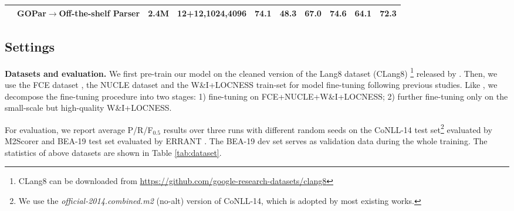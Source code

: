 \documentclass[11pt]{article}
\begin{document}
\begin{table*}[tp!]
{\begin{tabular}{clcccccccc}
                                   & \hspace{0.3cm}\textbf{GOPar$\rightarrow$Off-the-shelf Parser}&   2.4M &   12+12,1024,4096 & 74.1          & 48.3       & 67.0          & 74.6       & 64.1       & 72.3          \\
\bottomrule
\end{tabular}
}
\caption{\textbf{Single-model} results on English GEC test-sets. Our results are averaged over three runs with different random seeds. \textbf{Layer}, \textbf{Hidden} and \textbf{FFN} denote the depth, hidden size and feed-forward network size of Transformer. ``\textbf{w/ PLM}'' means using pre-trained language models. ``\textbf{w/ syntax}'' means using syntactic knowledge. Besides the public human-annotated training data, current GEC systems variously use private and/or artificial data, including: $^{\circ}$artificial Gigaword (70M sentences), $^{\vartriangle}$Wikipedia revision histories (170M), $^{\blacktriangle}$artificial Wikipedia (170M), $^{\square}$artificial Colossal Clean Crawled Corpus (200M), $^{\lozenge}$artificial one-billion-word (9M), $^{\blacklozenge}$artificial one-billion-word (10M), $^{\spadesuit}$artificial one-billion-word (30M) , $^{\heartsuit}$cleaned version of Lang8 (2.4M).}

\label{tab:main:results}
\end{table*} \subsection{Settings}
\label{sec:english:exp}
\textbf{Datasets and evaluation.} We first pre-train our model on the cleaned version of the Lang8 dataset (CLang8) \footnote{CLang8 can be downloaded from \url{https://github.com/google-research-datasets/clang8}} released by \citet{rothe2021recipe}. Then, we use the FCE dataset \citep{yannakoudakis2011new}, the NUCLE dataset \citep{dahlmeier2013building} and the W\&I+LOCNESS train-set \citep{bryant2019bea} for model fine-tuning following previous studies. Like \citet{omelianchuk2020gector}, we decompose the fine-tuning procedure into two stages: 1) fine-tuning on FCE+NUCLE+W\&I+LOCNESS; 2) further fine-tuning only on the small-scale but high-quality W\&I+LOCNESS. 

For evaluation, we report average P/R/F$_{0.5}$ results over three runs with different random seeds on the CoNLL-14 test set\footnote{We use the \textit{official-2014.combined.m2} (no-alt) version of CoNLL-14, which is adopted by most existing works.}
\citep{ng2014conll} evaluated by M2Scorer \citep{dahlmeier2012better} and BEA-19 test set \citep{bryant2019bea} evaluated by ERRANT \citep{bryant2017automatic}. The BEA-19 dev set serves as validation data during the whole training. The statistics of above datasets are shown in Table \ref{tab:dataset}. 
\end{document}
